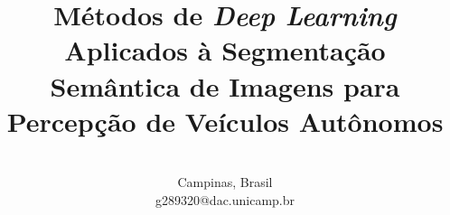 \documentclass[conference]{IEEEtran}
\newenvironment{note}{
	\color{gray}
}
\begin{document}
\title{\huge{Métodos de \textit{Deep Learning} Aplicados à Segmentação Semântica de Imagens para Percepção de Veículos Autônomos}}

\author{
\\
Campinas, Brasil \\
g289320@dac.unicamp.br}

\maketitle

\begin{abstract}


No contexto de veículos autônomos, a percepção do ambiente urbano se faz peça chave para a viabilidade, desempenho e segurança da aplicação da presença dos mesmos na sociedade. Nesse âmbito, a visão computacional por meio de técnicas como segmentação semântica de imagens consegue entender o ambiente, e com isso conseguir distinguir área navegável de obstáculos. Existem soluções para tal tarefa, que empregam a necessidade de grande pré-processamento dos dados, porém, métodos de \textit{deep learing} permitem que a segmentação semântica seja realizada em tempo real, aprendendo diretamente dos dados brutos. Nesse sentido, este trabalho aplica uma rede neural profunda com arquitetura \textit{two-branch} baseada na rede STDC para segmentação semântica de imagens com uso do \textit{dataset} Cityscapes e validação com imagens capturadas pelo autor. Dessa forma, foi visto que o desempenho da rede STDC foi satisfatório, chegando a valores de mIoU dentro do estado da arte, e que o treinamento da rede por meio do \textit{dataset}, ao ser aplicado em imagens obtidas pelo autor apresentou erros em relação a entidades muito diferentes das vistas no treinamento, porém, ainda assim conseguindo diferenciar área navegável de obstáculos. Dessa forma, a verificação da necessidade \textit{fine tunning} com dados locais pode ser importante para o desempenho e confiabilidade da solução.

\end{abstract}
\end{document}
